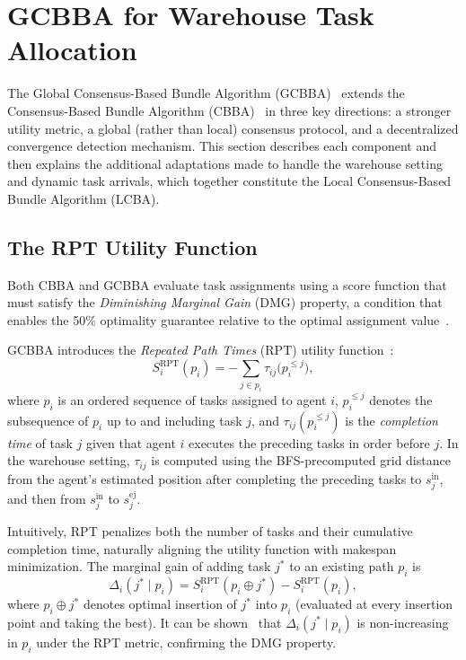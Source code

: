\section{GCBBA for Warehouse Task Allocation}
\label{sec:method_gcbba}

The Global Consensus-Based Bundle Algorithm
(GCBBA)~\cite{kha2025enhancing} extends the Consensus-Based Bundle
Algorithm (CBBA)~\cite{choi2009consensus} in three key directions: a stronger
utility metric, a global (rather than local) consensus protocol, and a
decentralized convergence detection mechanism.
This section describes each component and then explains the additional
adaptations made to handle the warehouse setting and dynamic task arrivals,
which together constitute the Local Consensus-Based Bundle Algorithm (LCBA).


\subsection{The RPT Utility Function}
\label{subsec:method_rpt}

Both CBBA and GCBBA evaluate task assignments using a score function that
must satisfy the \emph{Diminishing Marginal Gain} (DMG) property, a condition
that enables the 50\% optimality guarantee relative to the optimal assignment
value~\cite{fisher1978analysis}.

GCBBA introduces the \emph{Repeated Path Times} (RPT) utility
function~\cite{kha2025enhancing}:
\begin{equation}
  S_i^{\text{RPT}}(p_i) = -\sum_{j \in p_i}
    \tau_{ij}\!\bigl(p_i^{\le j}\bigr),
  \label{eq:rpt}
\end{equation}
where $p_i$ is an ordered sequence of tasks assigned to agent $i$,
$p_i^{\le j}$ denotes the subsequence of $p_i$ up to and including task $j$,
and $\tau_{ij}(p_i^{\le j})$ is the \emph{completion time} of task $j$
given that agent $i$ executes the preceding tasks in order before $j$.
In the warehouse setting, $\tau_{ij}$ is computed using the BFS-precomputed
grid distance from the agent's estimated position after completing the
preceding tasks to $s_j^{\text{in}}$, and then from $s_j^{\text{in}}$ to
$s_j^{\text{ej}}$.

Intuitively, RPT penalizes both the number of tasks and their cumulative
completion time, naturally aligning the utility function with makespan
minimization.
The marginal gain of adding task $j^*$ to an existing path $p_i$ is
\begin{equation}
  \Delta_i(j^* \mid p_i) = S_i^{\text{RPT}}(p_i \oplus j^*) - S_i^{\text{RPT}}(p_i),
  \label{eq:marginal}
\end{equation}
where $p_i \oplus j^*$ denotes optimal insertion of $j^*$ into $p_i$
(evaluated at every insertion point and taking the best).
It can be shown~\cite{kha2025enhancing} that $\Delta_i(j^* \mid p_i)$ is
non-increasing in $p_i$ under the RPT metric, confirming the DMG property.


